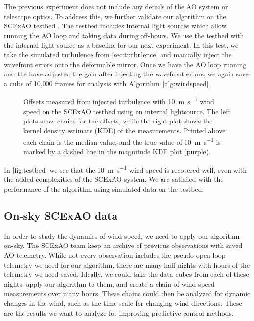 The previous experiment does not include any details of the AO system or telescope optics. To address this, we further validate our algorithm on the SCExAO testbed \citep{guyon_wavefront_2011}. The testbed includes internal light sources which allow running the AO loop and taking data during off-hours. We use the testbed with the internal light source as a baseline for our next experiment. In this test, we take the simulated turbulence from \autoref{sec:turbulence} and manually inject the wavefront errors onto the deformable mirror. Once we have the AO loop running and the have adjusted the gain after injecting the wavefront errors, we again save a cube of 10,000 frames for analysis with Algorithm~\autoref{alg:windspeed}.

\begin{figure}
    \centering
    \caption{Offsets measured from injected turbulence with \SI{10}{\meter\per\second} wind speed on the SCExAO testbed using an internal lightsource. The left plots show chains for the offsets, while the right plot shows the kernel density estimate (KDE) of the measurements. Printed above each chain is the median value, and the true value of \SI{10}{\meter\per\second} is marked by a dashed line in the magnitude KDE plot (purple).}
    \label{fig:testbed}
\end{figure}

In \autoref{fig:testbed} we see that the \SI{10}{\meter\per\second} wind speed is recovered well, even with the added complexities of the SCExAO system. We are satisfied with the performance of the algorithm using simulated data on the testbed.

\subsection{On-sky SCExAO data} \label{sec:onsky}

In order to study the dynamics of wind speed, we need to apply our algorithm on-sky. The SCExAO team keep an archive of previous observations with saved AO telemetry. While not every observation includes the pseudo-open-loop telemetry we need for our algorithm, there are many half-nights with hours of the telemetry we need saved. Ideally, we could take the data cubes from each of these nights, apply our algorithm to them, and create a chain of wind speed measurements over many hours. These chains could then be analyzed for dynamic changes in the wind, such as the time scale for changing wind directions. These are the results we want to analyze for improving predictive control methods.

